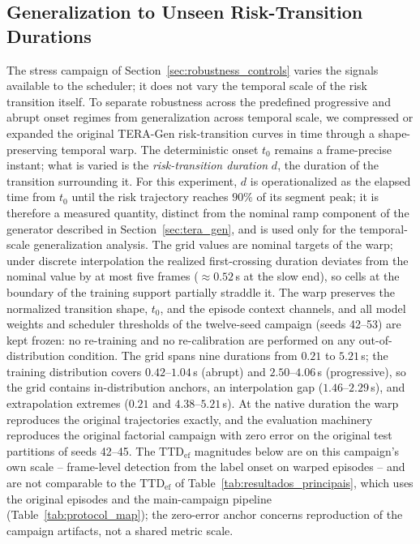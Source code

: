 \documentclass[a4paper,fleqn]{cas-dc}
\newcommand{\TERAGen}{\mbox{TERA-Gen}\xspace}
\begin{document}
{\color{\revcolor}
\subsection{Generalization to Unseen Risk-Transition Durations}
\label{sec:temporal_scale}
The stress campaign of Section~\ref{sec:robustness_controls} varies the
signals available to the scheduler; it does not vary the temporal scale of
the risk transition itself. To separate robustness across the predefined
progressive and abrupt onset regimes from generalization across temporal
scale, we compressed or expanded the original \TERAGen risk-transition
curves in time through a shape-preserving temporal warp. The deterministic
onset $t_0$ remains a frame-precise instant; what is varied is the
\emph{risk-transition duration} $d$, the duration of the transition
surrounding it. For this experiment, $d$ is operationalized as the elapsed
time from $t_0$ until the risk trajectory reaches $90\%$ of its segment
peak; it is therefore a measured quantity, distinct from the nominal ramp
component of the generator described in Section~\ref{sec:tera_gen}, and is
used only for the temporal-scale generalization analysis. The grid values are
nominal targets of the warp; under discrete interpolation the realized
first-crossing duration deviates from the nominal value by at most five
frames ($\approx$$0.52$\,s at the slow end), so cells at the boundary of the
training support partially straddle it. The warp preserves the normalized transition shape, $t_0$,
and the episode context channels, and all model weights and scheduler
thresholds of the twelve-seed campaign (seeds 42--53) are kept frozen: no
re-training and no re-calibration are performed on any out-of-distribution
condition. The grid spans nine durations from $0.21$ to $5.21$\,s; the
training distribution covers $0.42$--$1.04$\,s (abrupt) and
$2.50$--$4.06$\,s (progressive), so the grid contains in-distribution
anchors, an interpolation gap ($1.46$--$2.29$\,s), and extrapolation
extremes ($0.21$ and $4.38$--$5.21$\,s). At the native duration the warp
reproduces the original trajectories exactly, and the evaluation machinery
reproduces the original factorial campaign with zero error on the original
test partitions of seeds 42--45. {\color{\revcolor}The
$\mathrm{TTD}_{\mathrm{ef}}$ magnitudes below are on this campaign's own
scale -- frame-level detection from the label onset on warped episodes -- and
are not comparable to the $\mathrm{TTD}_{\mathrm{ef}}$ of
Table~\ref{tab:resultados_principais}, which uses the original episodes and
the main-campaign pipeline
(Table~\ref{tab:protocol_map}); the zero-error anchor concerns reproduction
of the campaign artifacts, not a shared metric scale.}

}
\end{document}
